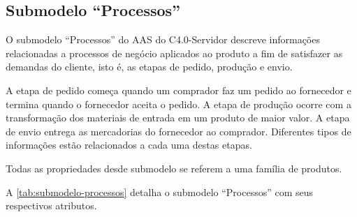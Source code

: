 \subsection{Submodelo ``Processos''}

O submodelo ``Processos'' do AAS do C4.0-Servidor descreve informações relacionadas a processos de negócio aplicados ao produto a fim de satisfazer as demandas do cliente, isto é, as etapas de pedido, produção e envio.

A etapa de pedido começa quando um comprador faz um pedido ao fornecedor e termina quando o fornecedor aceita o pedido. A etapa de produção ocorre com a transformação dos materiais de entrada em um produto de maior valor. A etapa de envio entrega as mercadorias do fornecedor ao comprador. Diferentes tipos de informações estão relacionados a cada uma destas etapas.

Todas as propriedades desde submodelo se referem a uma família de produtos.

A \autoref{tab:submodelo-processos} detalha o submodelo ``Processos'' com seus respectivos atributos.


